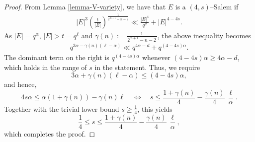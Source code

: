 \documentclass[11pt]{article}
\begin{document}
\begin{proof}
    From Lemma \ref{lemma-V-variety}, we have that $E$ is a $(4,s)$--Salem if 
    \begin{align*}
        |E|^{3}\!
  \left(\frac{t}{|E|}\right)^{\!\frac{1}{2^{\,n+1}-n-2}} \ll \frac{|E|^4}{q^d}+|E|^{4-4s}.
    \end{align*}
    As $|E|=q^{\alpha}$, $|E|>t=q^{\ell}$ and $\gamma(n):= \frac{1}{\,2^{\,n+1}-n-2\,}$, the above inequality becomes 
    \begin{align*}
        q^{3\alpha-\gamma(n)(\ell-\alpha)} \ll q^{4\alpha-d} +q^{(4-4s)\alpha} .
    \end{align*}
    The dominant term on the right is $q^{(4-4s)\alpha}$ whenever  
\((4-4s)\alpha \ge 4\alpha-d\), which holds in the range of $s$ in the statement.
Thus, we require
\[
    3\alpha+\gamma(n)(\ell-\alpha)
    \le (4-4s)\alpha,
\]
and hence,
\[
    4s\alpha \le \alpha(1+\gamma(n)) - \gamma(n)\ell
    \quad\Longleftrightarrow\quad
    s \le \frac{1+\gamma(n)}{4}
      - \frac{\gamma(n)}{4}\,\frac{\ell}{\alpha}.
\]
Together with the trivial lower bound $s\ge \tfrac14$, this yields
\[
    \frac14 \le s \le 
    \frac{1+\gamma(n)}{4}
    - \frac{\gamma(n)}{4}\,\frac{\ell}{\alpha},
\]
which completes the proof.
\end{proof}

\end{document}
